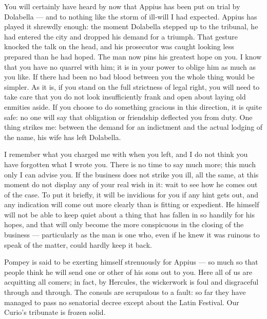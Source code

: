

 You will certainly have heard by now that Appius has been put on trial by Dolabella --- and to nothing like the storm of ill-will I had expected. Appius has played it shrewdly enough: the moment Dolabella stepped up to the tribunal, he had entered the city and dropped his demand for a triumph. That gesture knocked the talk on the head, and his prosecutor was caught looking less prepared than he had hoped. The man now pins his greatest hope on you. I know that you have no quarrel with him; it is in your power to oblige him as much as you like. If there had been no bad blood between you the whole thing would be simpler. As it is, if you stand on the full strictness of legal right, you will need to take care that you do not look insufficiently frank and open about laying old enmities aside. If you choose to do something gracious in this direction, it is quite safe: no one will say that obligation or friendship deflected you from duty. One thing strikes me: between the demand for an indictment and the actual lodging of the name, his wife has left Dolabella.

 I remember what you charged me with when you left, and I do not think you have forgotten what I wrote you. There is no time to say much more; this much only I can advise you. If the business does not strike you ill, all the same, at this moment do not display any of your real wish in it: wait to see how he comes out of the case. To put it briefly, it will be invidious for you if any hint gets out, and any indication will come out more clearly than is fitting or expedient. He himself will not be able to keep quiet about a thing that has fallen in so handily for his hopes, and that will only become the more conspicuous in the closing of the business --- particularly as the man is one who, even if he knew it was ruinous to speak of the matter, could hardly keep it back.

 Pompey is said to be exerting himself strenuously for Appius --- so much so that people think he will send one or other of his sons out to you. Here all of us are acquitting all comers; in fact, by Hercules, the wickerwork is foul and disgraceful through and through. The consuls are scrupulous to a fault: so far they have managed to pass no senatorial decree except about the Latin Festival. Our Curio's tribunate is frozen solid.

